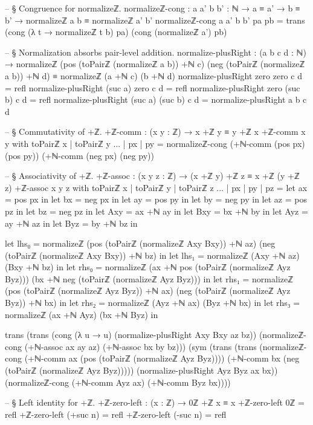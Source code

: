 \documentclass[11pt,a4paper]{book}
\begin{document}
\begin{code}
-- § Congruence for normalizeℤ.
normalizeℤ-cong : {a a' b b' : ℕ} → a ≡ a' → b ≡ b' → normalizeℤ a b ≡ normalizeℤ a' b'
normalizeℤ-cong {a} {a'} {b} {b'} pa pb = trans (cong (λ t → normalizeℤ t b) pa) (cong (normalizeℤ a') pb)

-- § Normalization absorbs pair-level addition.
normalize-plusRight : (a b c d : ℕ) →
  normalizeℤ (pos (toPairℤ (normalizeℤ a b)) +ℕ c) (neg (toPairℤ (normalizeℤ a b)) +ℕ d)
    ≡
  normalizeℤ (a +ℕ c) (b +ℕ d)
normalize-plusRight zero zero c d = refl
normalize-plusRight (suc a) zero c d = refl
normalize-plusRight zero (suc b) c d = refl
normalize-plusRight (suc a) (suc b) c d = normalize-plusRight a b c d

-- § Commutativity of +ℤ.
+ℤ-comm : (x y : ℤ) → x +ℤ y ≡ y +ℤ x
+ℤ-comm x y with toPairℤ x | toPairℤ y
... | px | py =
  normalizeℤ-cong (+ℕ-comm (pos px) (pos py)) (+ℕ-comm (neg px) (neg py))

-- § Associativity of +ℤ.
+ℤ-assoc : (x y z : ℤ) → (x +ℤ y) +ℤ z ≡ x +ℤ (y +ℤ z)
+ℤ-assoc x y z with toPairℤ x | toPairℤ y | toPairℤ z
... | px | py | pz =
  let ax = pos px in
  let bx = neg px in
  let ay = pos py in
  let by = neg py in
  let az = pos pz in
  let bz = neg pz in
  let Axy = ax +ℕ ay in
  let Bxy = bx +ℕ by in
  let Ayz = ay +ℕ az in
  let Byz = by +ℕ bz in

  let lhs₀ = normalizeℤ (pos (toPairℤ (normalizeℤ Axy Bxy)) +ℕ az)
                       (neg (toPairℤ (normalizeℤ Axy Bxy)) +ℕ bz) in
  let lhs₁ = normalizeℤ (Axy +ℕ az) (Bxy +ℕ bz) in
  let rhs₀ = normalizeℤ (ax +ℕ pos (toPairℤ (normalizeℤ Ayz Byz)))
                       (bx +ℕ neg (toPairℤ (normalizeℤ Ayz Byz))) in
  let rhs₁ = normalizeℤ (pos (toPairℤ (normalizeℤ Ayz Byz)) +ℕ ax)
                       (neg (toPairℤ (normalizeℤ Ayz Byz)) +ℕ bx) in
  let rhs₂ = normalizeℤ (Ayz +ℕ ax) (Byz +ℕ bx) in
  let rhs₃ = normalizeℤ (ax +ℕ Ayz) (bx +ℕ Byz) in

  trans
    (trans
      (cong (λ u → u) (normalize-plusRight Axy Bxy az bz))
      (normalizeℤ-cong (+ℕ-assoc ax ay az) (+ℕ-assoc bx by bz)))
    (sym
      (trans
        (trans
          (normalizeℤ-cong (+ℕ-comm ax (pos (toPairℤ (normalizeℤ Ayz Byz))))
                           (+ℕ-comm bx (neg (toPairℤ (normalizeℤ Ayz Byz)))))
          (normalize-plusRight Ayz Byz ax bx))
        (normalizeℤ-cong (+ℕ-comm Ayz ax) (+ℕ-comm Byz bx))))

-- § Left identity for +ℤ.
+ℤ-zero-left : (x : ℤ) → 0ℤ +ℤ x ≡ x
+ℤ-zero-left 0ℤ = refl
+ℤ-zero-left (+suc n) = refl
+ℤ-zero-left (-suc n) = refl


\end{code}
\end{document}
